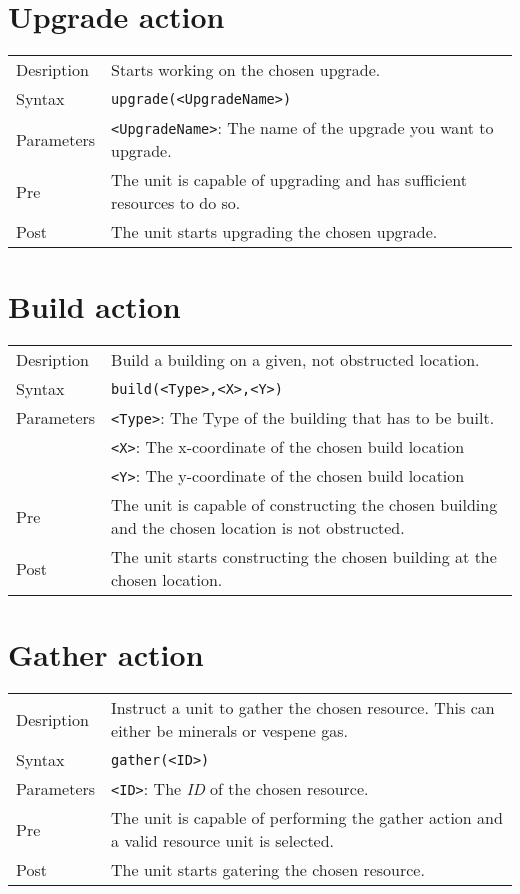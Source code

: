 \section{Upgrade action}
\begin{tabularx}{\textwidth}{lX}
 Desription & Starts working on the chosen upgrade. \\
 Syntax & \verb|upgrade(<UpgradeName>)| \\
 Parameters & \verb|<UpgradeName>|: The name of the upgrade you want to upgrade.\\
 Pre & The unit is capable of upgrading and has sufficient resources to do so. \\
 Post & The unit starts upgrading the chosen upgrade.
\end{tabularx}

\section{Build action}
\begin{tabularx}{\textwidth}{lX}
 Desription & Build a building on a given, not obstructed location. \\
 Syntax & \verb|build(<Type>,<X>,<Y>)| \\
 Parameters & \verb|<Type>|: The Type of the building that has to be built.\\
            & \verb|<X>|: The x-coordinate of the chosen build location \\
            & \verb|<Y>|: The y-coordinate of the chosen build location \\
 Pre & The unit is capable of constructing the chosen building and the chosen location is not obstructed. \\
 Post & The unit starts constructing the chosen building at the chosen location.
\end{tabularx}

\section{Gather action}
\begin{tabularx}{\textwidth}{lX}
 Desription & Instruct a unit to gather the chosen resource. This can either be minerals or vespene gas. \\
 Syntax & \verb|gather(<ID>)| \\
 Parameters & \verb|<ID>|: The \textit{ID} of the chosen resource. \\
 Pre & The unit is capable of performing the gather action and a valid resource unit is selected. \\
 Post & The unit starts gatering the chosen resource. 
\end{tabularx}

